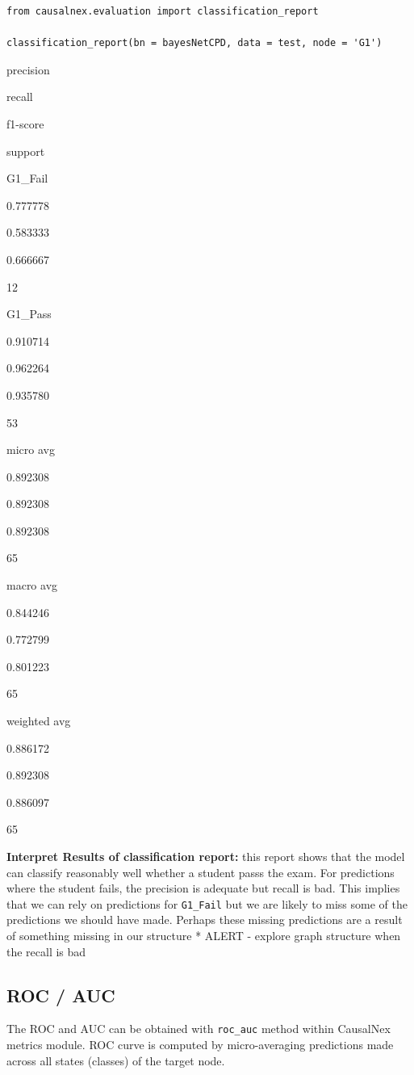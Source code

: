 \documentclass[
]{article}
\begin{document}
\begin{verbatim}
from causalnex.evaluation import classification_report

classification_report(bn = bayesNetCPD, data = test, node = 'G1')
\end{verbatim}

precision

recall

f1-score

support

G1\_Fail

0.777778

0.583333

0.666667

12

G1\_Pass

0.910714

0.962264

0.935780

53

micro avg

0.892308

0.892308

0.892308

65

macro avg

0.844246

0.772799

0.801223

65

weighted avg

0.886172

0.892308

0.886097

65

\textbf{Interpret Results of classification report:} this report shows
that the model can classify reasonably well whether a student passs the
exam. For predictions where the student fails, the precision is adequate
but recall is bad. This implies that we can rely on predictions for
\texttt{G1_Fail} but we are likely to miss some of the
predictions we should have made. Perhaps these missing predictions are a
result of something missing in our structure * ALERT - explore graph
structure when the recall is bad

\hypertarget{roc-auc}{%
\subsection{ROC / AUC}\label{roc-auc}}

The ROC and AUC can be obtained with \texttt{roc_auc}
method within CausalNex metrics module. ROC curve is computed by
micro-averaging predictions made across all states (classes) of the
target node.
\end{document}
